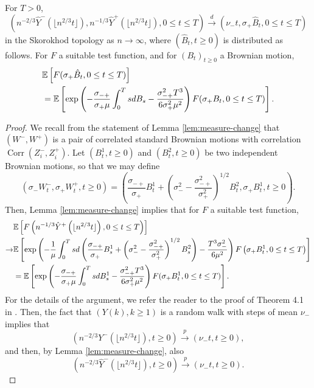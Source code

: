 \begin{theorem}\label{theorem.convaftermeasurechange} 
 For $T>0$,
$$\left(n^{-2/3}\hat{Y}^-\left(\lfloor n^{2/3} t\rfloor\right), n^{-1/3}\hat{Y}^+\left(\lfloor  n^{2/3} t\rfloor\right), 0\leq t \leq T \right) \overset{d}{\to} \left( \nu_- t, \sigma_+\hat{B}_t, 0 \leq t \leq T \right)$$
in the Skorokhod topology as $n\to \infty$, where $(\hat{B}_t, t\geq 0)$ is distributed as follows.
For $F$ a suitable test function, and for $(B_t)_{t\geq 0}$ a Brownian motion,
\begin{align*} &{\mathbb E}\left[F(\sigma_+ \hat{B}_t,0\leq t \leq T)\right]\\&={\mathbb E}\left[\exp\left(-\frac{\sigma_{-+}}{\sigma_+ \mu} \int_0^T s dB_s -\frac{\sigma_{-+}^2 T^3}{6\sigma_+^2 \mu^2}\right)F(\sigma_+ B_t,   0\leq t \leq T)\right].\end{align*}

\end{theorem}
\begin{proof}
 We recall from the statement of Lemma \ref{lem:measure-change} that $(W^-,W^+)$ is a pair of correlated standard Brownian motions with correlation $\operatorname{Corr}(Z_i^-,Z_i^+)$. 
Let $(B^1_t,t\geq 0)$ and $(B^2_t,t\geq 0)$ be two independent Brownian motions, so that we may define $$(\sigma_-W^-_t,\sigma_+W^+_t,t\geq 0)=\left(\frac{\sigma_{-+}}{\sigma_+}B_t^1+\left(\sigma_-^2-\frac{\sigma_{-+}^2}{\sigma_+^2}\right)^{1/2} B_t^2, \sigma_+ B_t^1, t\geq 0\right).$$ 
 Then, Lemma \ref{lem:measure-change} implies that for $F$ a suitable test function, 
 \begin{align*}&\E\left[F\left(n^{-1/3}\hat{Y}^+\left(\lfloor n^{2/3}t\rfloor\right), 0\leq t \leq T \right) \right]\\\to& \E\left[\exp\left(-\frac{1}{\mu}\int_0^Tsd\left(\frac{\sigma_{-+}}{\sigma_+}B_s^1+\left(\sigma_-^2-\frac{\sigma_{-+}^2}{\sigma_+^2}\right)^{1/2}B_s^2\right) - \frac{T^3 \sigma_-^2}{6\mu^2}\right) F\left(\sigma_+ B_t^1, 0\leq t \leq T\right)\right]\\
 &=\E\left[\exp\left(-\frac{\sigma_{-+}}{\sigma_+ \mu} \int_0^T s dB^1_s -\frac{\sigma_{-+}^2 T^3}{6\sigma_+^2 \mu^2}\right)F(\sigma_+ B^1_t,   0\leq t \leq T)\right].\end{align*}
 For the details of the argument, we refer the reader to the proof of Theorem 4.1 in \cite{conchon--kerjanStableGraphMetric2020}. Then, the fact that $(Y(k),k\geq 1)$ is a random walk with steps of mean $\nu_-$ implies that
 $$\left(n^{-2/3}Y^-\left(\lfloor n^{2/3}t\rfloor\right),t\geq 0\right)\overset{p}{\to}\left(\nu_- t,t\geq 0\right),$$
 and then, by Lemma \ref{lem:measure-change}, also 
 $$\left(n^{-2/3}\hat{Y}^-\left(\lfloor n^{2/3}t\rfloor\right),t\geq 0\right)\overset{p}{\to}\left(\nu_- t,t\geq 0\right).$$
 \end{proof}
